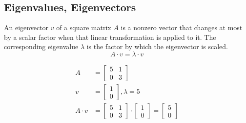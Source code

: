 \subsection{Eigenvalues, Eigenvectors}\label{eigen}
An eigenvector \( v \) of a square matrix \(A\) is a nonzero vector that changes at most by a scalar factor when that linear transformation is applied to it. The corresponding eigenvalue $\lambda$ is the factor by which the eigenvector is scaled.
\begin{equation} \label{eigenexpression}
    A\cdot v = \lambda \cdot v
\end{equation}
\begin{example}
    \begin{align*}
        A         & = \begin{bmatrix}
            5 & 1 \\ 0 & 3
        \end{bmatrix}                                                               \\
        v         & = \begin{bmatrix}
            1 \\ 0
        \end{bmatrix}, \lambda = 5                                                  \\
        A \cdot v & = \begin{bmatrix}
            5 & 1 \\ 0 & 3
        \end{bmatrix} \cdot \begin{bmatrix}
            1 \\ 0
        \end{bmatrix} = \begin{bmatrix}
            5 \\ 0
        \end{bmatrix}
    \end{align*}
\end{example}
